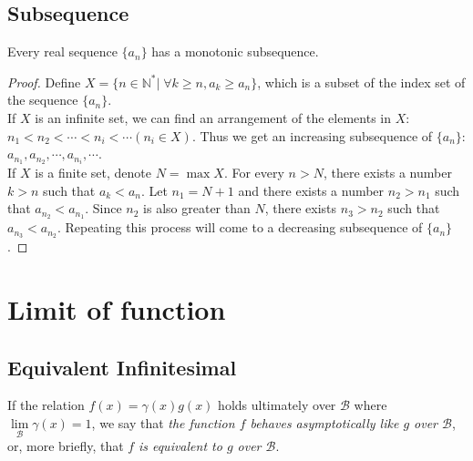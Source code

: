 \documentclass[11pt,fleqn]{book} %
\begin{document}
\section{Subsequence}

\begin{proposition}
    Every real sequence $\{a_n\}$ has a monotonic subsequence.
\end{proposition}

\begin{proof}
	Define $X=\{n\in \mathbb{N^*}| \;\forall k\ge n, a_k\ge a_n\}$, which is a subset of the index set of the sequence $\{a_n\}$.\\
	If $X$ is an infinite set, we can find an arrangement of the elements in $X$: $n_1<n_2<\cdots<n_i<\cdots(n_i\in X)$. Thus we get an increasing subsequence of $\{a_n\}$: $a_{n_1},a_{n_2},\cdots,a_{n_i},\cdots$.\\
	If $X$ is a finite set, denote $N=\max X$. For every $n>N$, there exists a number $k>n$ such that $a_k<a_n$. Let $n_1=N+1$ and there exists a number $n_2>n_1$ such that $a_{n_2}<a_{n_1}$. Since $n_2$ is also greater than $N$, there exists $n_3>n_2$ such that $a_{n_3}<a_{n_2}$. Repeating this process will come to a decreasing subsequence of $\{a_n\}$.
\end{proof}



\chapter{Limit of function}

\section{Equivalent Infinitesimal}

\begin{definition}
If the relation $f(x)=\gamma(x)g(x)$ holds ultimately over $\mathcal{B}$ where $\lim\limits_{\mathcal{B}}{\gamma(x)}=1$, we say that \emph{the function $f$ behaves asymptotically like $g$ over $\mathcal{B}$}, or, more briefly, that $f$ \emph{is equivalent to $g$ over $\mathcal{B}$}.



\end{definition}

\end{document}
